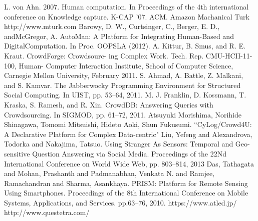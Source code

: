 \documentclass{deimj}
\begin{document}
\begin{thebibliography}{99}
L. von Ahn. 2007. Human computation. In Proceedings of the 4th international conference on Knowledge capture. K-CAP '07. ACM.
Amazon Machanical Turk
http://www.mturk.com
Barowy, D. W., Curtsinger, C., Berger, E. D., andMcGregor, A. AutoMan: A Platform for Integrating Human-Based and DigitalComputation. In Proc. OOPSLA (2012).
A. Kittur, B. Smus, and R. E. Kraut. CrowdForge: Crowdsourc- ing Complex Work. Tech. Rep. CMU-HCII-11-100, Human- Computer Interaction Institute, School of Computer Science, Carnegie Mellon University, February 2011.
S. Ahmad, A. Battle, Z. Malkani, and S. Kamvar. The Jabberwocky Programming Environment for Structured Social Computing. In UIST, pp. 53–64, 2011.
M. J. Franklin, D. Kossmann, T. Kraska, S. Ramesh, and R. Xin. CrowdDB: Answering Queries with Crowdsourcing. In SIGMOD, pp. 61–72, 2011.
Atsuyuki Morishima, Norihide Shinagawa, Tomomi Mitsuishi, Hideto Aoki, Shun Fukusumi. “CyLog/Crowd4U: A Declarative Platform for Complex Data-centric"
Liu, Yefeng and Alexandrova, Todorka and Nakajima, Tatsuo. Using Stranger As Sensors: Temporal and Geo-sensitive Question Answering via Social Media. Proceedings of the 22Nd International Conference on World Wide Web, pp. 803--814, 2013
Das, Tathagata and Mohan, Prashanth and Padmanabhan, Venkata N. and Ramjee, Ramachandran and Sharma, Asankhaya. PRISM: Platform for Remote Sensing Using Smartphones. Proceedings of the 8th International Conference on Mobile Systems, Applications, and Services. pp.63--76, 2010.
https://www.atled.jp/
http://www.questetra.com/
\end{thebibliography}
\end{document}

